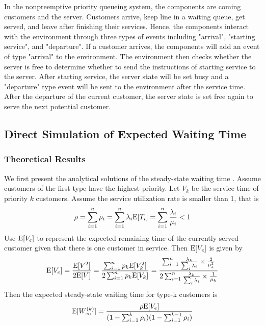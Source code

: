 \documentclass{article}
\begin{document}
In the nonpreemptive priority queueing system, the components are coming customers and the server. Customers arrive, keep line in a waiting queue, get served, and leave after finishing their services. Hence, the components interact with the environment through three types of events including "arrival", "starting service", and "departure". If a customer arrives, the components will add an event of type "arrival" to the environment. The environment then checks whether the server is free to determine whether to send the instructions of starting service to the server. After starting service, the server state will be set busy and a "departure" type event will be sent to the environment after the service time. 
After the departure of the current customer, the server state is set free again to serve the next potential customer.

\subsection{Direct Simulation of Expected Waiting Time}
\subsubsection{Theoretical Results}
We first present the analytical solutions of the steady-state waiting time \citep{harchol2013performance}.
Assume customers of the first type have the highest priority. Let $V_k$ be the service time of priority $k$ customers.  
Assume the service utilization rate is smaller than 1, that is 
\begin{equation}
	\rho = \sum_{i=1}^n \rho_i = \sum_{i=1}^n \lambda_i {\rm E}[T_i] = \sum_{i=1}^n \frac{\lambda_i}{\mu_i} < 1
\end{equation}
Use ${\rm E}[V_e]$ to represent the expected remaining time of the currently served customer given that there is one customer in service. Then ${\rm E}[V_e]$ is given by
\begin{equation}
	{\rm E}[V_e] = \frac{{\rm E}[V^2]}{2{\rm E}[V]} = \frac{\sum_{i=1}^n p_k {\rm E}[V_k^2] }{2\sum_{i=1}^n p_k{\rm E}[V_k]}=\frac{\sum_{i=1}^n \frac{\lambda_k}{\sum_i \lambda_i}\times \frac{2}{\mu_k^2}}{2\sum_{i=1}^n \frac{\lambda_k}{\sum_i \lambda_i}\times \frac{1}{\mu_k}}
\end{equation} 
Then the expected steady-state waiting time for type-k customers is
\begin{equation}
	{\rm E}[W_{\infty}^{(k)}] = \frac{\rho {\rm E}[V_e]}{(1-\sum_{i=1}^k \rho_i)(1-\sum_{i=1}^{k-1}\rho_i)}
\end{equation}
\end{document}
